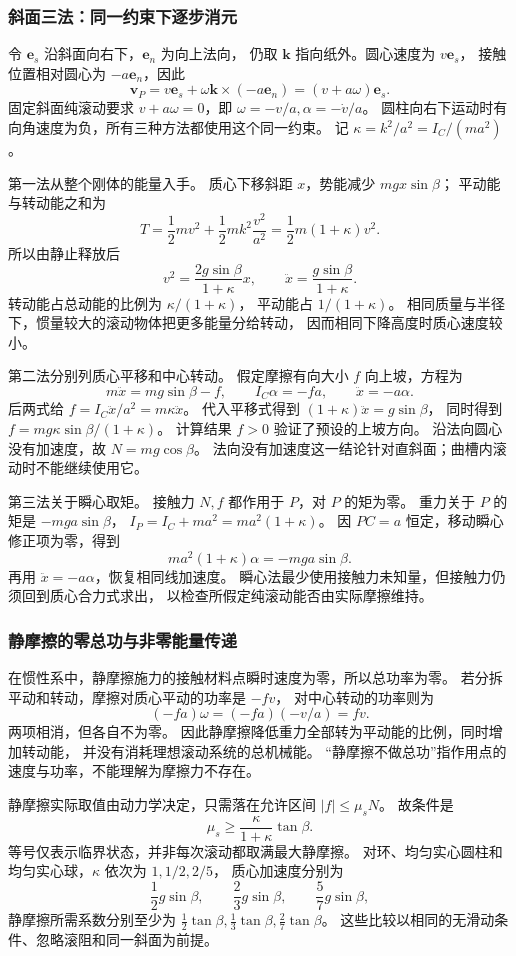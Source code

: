 \documentclass[UTF8,zihao=-4,fontset=fandol,a4paper]{ctexart}
\newcommand{\vect}[1]{\bm{#1}}
\begin{document}
\subsubsection*{斜面三法：同一约束下逐步消元}
令 $\vect e_s$ 沿斜面向右下，$\vect e_n$ 为向上法向，
仍取 $\vect k$ 指向纸外。圆心速度为 $v\vect e_s$，
接触位置相对圆心为 $-a\vect e_n$，因此
\[
\vect v_P=v\vect e_s+\omega\vect k\times(-a\vect e_n)
=(v+a\omega)\vect e_s.
\]
固定斜面纯滚动要求 $v+a\omega=0$，即
$\omega=-v/a,\alpha=-\dot v/a$。
圆柱向右下运动时有向角速度为负，所有三种方法都使用这个同一约束。
记 $\kappa=k^2/a^2=I_C/(ma^2)$。

第一法从整个刚体的能量入手。
质心下移斜距 $x$，势能减少 $mgx\sin\beta$；
平动能与转动能之和为
\[
T=\frac12mv^2+\frac12mk^2\frac{v^2}{a^2}
=\frac12m(1+\kappa)v^2.
\]
所以由静止释放后
\[
v^2=\frac{2g\sin\beta}{1+\kappa}x,
\qquad \ddot x=\frac{g\sin\beta}{1+\kappa}.
\]
转动能占总动能的比例为 $\kappa/(1+\kappa)$，
平动能占 $1/(1+\kappa)$。
相同质量与半径下，惯量较大的滚动物体把更多能量分给转动，
因而相同下降高度时质心速度较小。

第二法分别列质心平移和中心转动。
假定摩擦有向大小 $f$ 向上坡，方程为
\[
m\ddot x=mg\sin\beta-f,
\qquad I_C\alpha=-fa,
\qquad \ddot x=-a\alpha.
\]
后两式给 $f=I_C\ddot x/a^2=m\kappa\ddot x$。
代入平移式得到 $(1+\kappa)\ddot x=g\sin\beta$，
同时得到 $f=mg\kappa\sin\beta/(1+\kappa)$。
计算结果 $f>0$ 验证了预设的上坡方向。
沿法向圆心没有加速度，故 $N=mg\cos\beta$。
法向没有加速度这一结论针对直斜面；曲槽内滚动时不能继续使用它。

第三法关于瞬心取矩。
接触力 $N,f$ 都作用于 $P$，对 $P$ 的矩为零。
重力关于 $P$ 的矩是 $-mga\sin\beta$，
$I_P=I_C+ma^2=ma^2(1+\kappa)$。
因 $PC=a$ 恒定，移动瞬心修正项为零，得到
\[
ma^2(1+\kappa)\alpha=-mga\sin\beta.
\]
再用 $\ddot x=-a\alpha$，恢复相同线加速度。
瞬心法最少使用接触力未知量，但接触力仍须回到质心合力式求出，
以检查所假定纯滚动能否由实际摩擦维持。

\subsubsection*{静摩擦的零总功与非零能量传递}
在惯性系中，静摩擦施力的接触材料点瞬时速度为零，所以总功率为零。
若分拆平动和转动，摩擦对质心平动的功率是 $-fv$，
对中心转动的功率则为
\[
(-fa)\omega=(-fa)(-v/a)=fv.
\]
两项相消，但各自不为零。
因此静摩擦降低重力全部转为平动能的比例，同时增加转动能，
并没有消耗理想滚动系统的总机械能。
“静摩擦不做总功”指作用点的速度与功率，不能理解为摩擦力不存在。

静摩擦实际取值由动力学决定，只需落在允许区间 $|f|\le\mu_sN$。
故条件是
\[
\mu_s\ge\frac{\kappa}{1+\kappa}\tan\beta.
\]
等号仅表示临界状态，并非每次滚动都取满最大静摩擦。
对环、均匀实心圆柱和均匀实心球，$\kappa$ 依次为 $1,1/2,2/5$，
质心加速度分别为
\[
\frac12g\sin\beta,\qquad\frac23g\sin\beta,\qquad\frac57g\sin\beta,
\]
静摩擦所需系数分别至少为
$\tfrac12\tan\beta,\tfrac13\tan\beta,\tfrac27\tan\beta$。
这些比较以相同的无滑动条件、忽略滚阻和同一斜面为前提。
\end{document}
